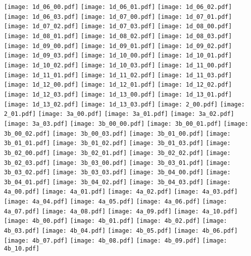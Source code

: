 \begin{center}
\texttt{[image: 1d\_06\_00.pdf]}
\texttt{[image: 1d\_06\_01.pdf]}
\texttt{[image: 1d\_06\_02.pdf]}
\texttt{[image: 1d\_06\_03.pdf]}
\texttt{[image: 1d\_07\_00.pdf]}
\texttt{[image: 1d\_07\_01.pdf]}
\texttt{[image: 1d\_07\_02.pdf]}
\texttt{[image: 1d\_07\_03.pdf]}
\texttt{[image: 1d\_08\_00.pdf]}
\texttt{[image: 1d\_08\_01.pdf]}
\texttt{[image: 1d\_08\_02.pdf]}
\texttt{[image: 1d\_08\_03.pdf]}
\texttt{[image: 1d\_09\_00.pdf]}
\texttt{[image: 1d\_09\_01.pdf]}
\texttt{[image: 1d\_09\_02.pdf]}
\texttt{[image: 1d\_09\_03.pdf]}
\texttt{[image: 1d\_10\_00.pdf]}
\texttt{[image: 1d\_10\_01.pdf]}
\texttt{[image: 1d\_10\_02.pdf]}
\texttt{[image: 1d\_10\_03.pdf]}
\texttt{[image: 1d\_11\_00.pdf]}
\texttt{[image: 1d\_11\_01.pdf]}
\texttt{[image: 1d\_11\_02.pdf]}
\texttt{[image: 1d\_11\_03.pdf]}
\texttt{[image: 1d\_12\_00.pdf]}
\texttt{[image: 1d\_12\_01.pdf]}
\texttt{[image: 1d\_12\_02.pdf]}
\texttt{[image: 1d\_12\_03.pdf]}
\texttt{[image: 1d\_13\_00.pdf]}
\texttt{[image: 1d\_13\_01.pdf]}
\texttt{[image: 1d\_13\_02.pdf]}
\texttt{[image: 1d\_13\_03.pdf]}
\texttt{[image: 2\_00.pdf]}
\texttt{[image: 2\_01.pdf]}
\texttt{[image: 3a\_00.pdf]}
\texttt{[image: 3a\_01.pdf]}
\texttt{[image: 3a\_02.pdf]}
\texttt{[image: 3a\_03.pdf]}
\texttt{[image: 3b\_00\_00.pdf]}
\texttt{[image: 3b\_00\_01.pdf]}
\texttt{[image: 3b\_00\_02.pdf]}
\texttt{[image: 3b\_00\_03.pdf]}
\texttt{[image: 3b\_01\_00.pdf]}
\texttt{[image: 3b\_01\_01.pdf]}
\texttt{[image: 3b\_01\_02.pdf]}
\texttt{[image: 3b\_01\_03.pdf]}
\texttt{[image: 3b\_02\_00.pdf]}
\texttt{[image: 3b\_02\_01.pdf]}
\texttt{[image: 3b\_02\_02.pdf]}
\texttt{[image: 3b\_02\_03.pdf]}
\texttt{[image: 3b\_03\_00.pdf]}
\texttt{[image: 3b\_03\_01.pdf]}
\texttt{[image: 3b\_03\_02.pdf]}
\texttt{[image: 3b\_03\_03.pdf]}
\texttt{[image: 3b\_04\_00.pdf]}
\texttt{[image: 3b\_04\_01.pdf]}
\texttt{[image: 3b\_04\_02.pdf]}
\texttt{[image: 3b\_04\_03.pdf]}
\texttt{[image: 4a\_00.pdf]}
\texttt{[image: 4a\_01.pdf]}
\texttt{[image: 4a\_02.pdf]}
\texttt{[image: 4a\_03.pdf]}
\texttt{[image: 4a\_04.pdf]}
\texttt{[image: 4a\_05.pdf]}
\texttt{[image: 4a\_06.pdf]}
\texttt{[image: 4a\_07.pdf]}
\texttt{[image: 4a\_08.pdf]}
\texttt{[image: 4a\_09.pdf]}
\texttt{[image: 4a\_10.pdf]}
\texttt{[image: 4b\_00.pdf]}
\texttt{[image: 4b\_01.pdf]}
\texttt{[image: 4b\_02.pdf]}
\texttt{[image: 4b\_03.pdf]}
\texttt{[image: 4b\_04.pdf]}
\texttt{[image: 4b\_05.pdf]}
\texttt{[image: 4b\_06.pdf]}
\texttt{[image: 4b\_07.pdf]}
\texttt{[image: 4b\_08.pdf]}
\texttt{[image: 4b\_09.pdf]}
\texttt{[image: 4b\_10.pdf]}
\end{center}
